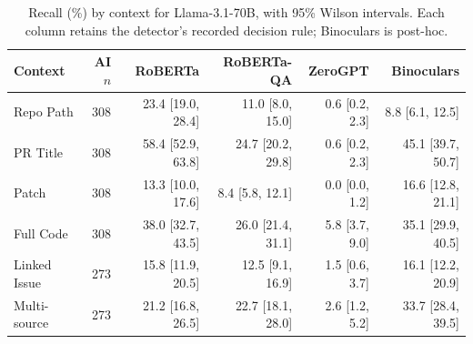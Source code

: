 \begin{table}[htbp]
\centering
\caption{Recall (\%) by context for Llama-3.1-70B, with 95\% Wilson intervals. Each column retains the detector's recorded decision rule; Binoculars is post-hoc.}
\label{tab:context_recall_intervals_3}
\small
\setlength{\tabcolsep}{4pt}
\renewcommand{\arraystretch}{1.15}
\begin{tabular}{lrrrrr}
\toprule
\textbf{Context} & \textbf{AI $n$} & \textbf{RoBERTa} & \textbf{RoBERTa-QA} & \textbf{ZeroGPT} & \textbf{Binoculars} \\
\midrule
Repo Path & 308 & 23.4 [19.0, 28.4] & 11.0 [8.0, 15.0] & 0.6 [0.2, 2.3] & 8.8 [6.1, 12.5] \\
PR Title & 308 & 58.4 [52.9, 63.8] & 24.7 [20.2, 29.8] & 0.6 [0.2, 2.3] & 45.1 [39.7, 50.7] \\
Patch & 308 & 13.3 [10.0, 17.6] & 8.4 [5.8, 12.1] & 0.0 [0.0, 1.2] & 16.6 [12.8, 21.1] \\
Full Code & 308 & 38.0 [32.7, 43.5] & 26.0 [21.4, 31.1] & 5.8 [3.7, 9.0] & 35.1 [29.9, 40.5] \\
Linked Issue & 273 & 15.8 [11.9, 20.5] & 12.5 [9.1, 16.9] & 1.5 [0.6, 3.7] & 16.1 [12.2, 20.9] \\
Multi-source & 273 & 21.2 [16.8, 26.5] & 22.7 [18.1, 28.0] & 2.6 [1.2, 5.2] & 33.7 [28.4, 39.5] \\
\bottomrule
\end{tabular}
\end{table}

\FloatBarrier
